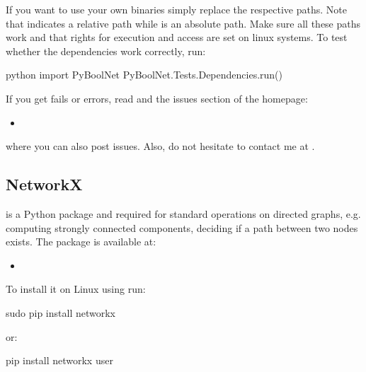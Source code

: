 \documentclass[letterpaper,10pt,english]{sphinxmanual}
\begin{document}
If you want to use your own binaries simply replace the respective paths. Note that  indicates a relative path while \sphinxcode{/} is an absolute path.
Make sure all these paths work and that rights for execution and access are set on linux systems.
To test whether the dependencies work correctly, run:

\begin{sphinxVerbatim}[commandchars=\\\{\}]
\PYGZdl{} python
\PYGZgt{}\PYGZgt{}\PYGZgt{} import PyBoolNet
\PYGZgt{}\PYGZgt{}\PYGZgt{} PyBoolNet.Tests.Dependencies.run()
\end{sphinxVerbatim}

If you get fails or errors, read {\hyperref[\detokenize{Installation:installation-troubleshooting}]{}} and the issues section of the homepage:
\begin{itemize}
\item {} 

\end{itemize}

where you can also post issues. Also, do not hesitate to contact me at .


\subsection{NetworkX}
\label{\detokenize{Installation:installation-networkx}}\label{\detokenize{Installation:networkx}}
 is a Python package and required for standard operations on directed graphs, e.g. computing strongly connected components,
deciding if a path between two nodes exists.
The package is available at:
\begin{itemize}
\item {} 

\end{itemize}

To install it on Linux using  run:

\begin{sphinxVerbatim}[commandchars=\\\{\}]
\PYGZdl{} sudo pip install networkx
\end{sphinxVerbatim}

or:

\begin{sphinxVerbatim}[commandchars=\\\{\}]
\PYGZdl{} pip install networkx \PYGZhy{}\PYGZhy{}user
\end{sphinxVerbatim}
\end{document}
